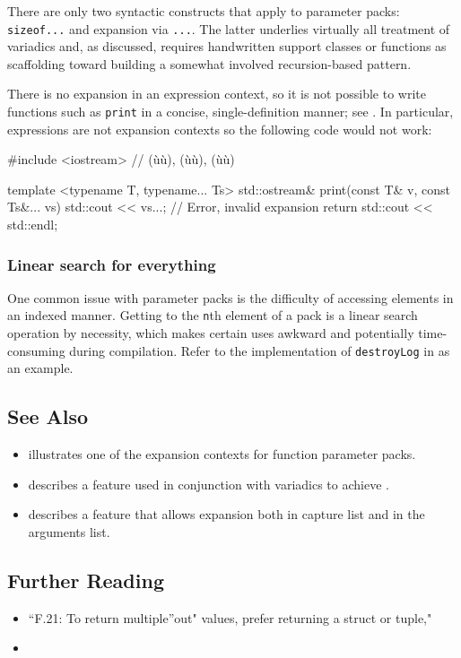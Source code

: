 There are only two syntactic constructs that apply to parameter packs:
\lstinline!sizeof...! and expansion via \lstinline!...!. The latter underlies
virtually all treatment of variadics and, as discussed, requires
handwritten support classes or functions as scaffolding toward building
a somewhat involved recursion-based pattern.

There is no expansion in an expression context, so it is not possible to
write functions such as \lstinline!print! in a concise, single-definition
manner; see . In particular, expressions are not expansion contexts so
the following code would not work:

\begin{emcppslisting}
#include <iostream>  // (ù{}ù), (ù{}ù), (ù{}ù)

template <typename T, typename... Ts>
std::ostream& print(const T& v, const Ts&... vs)
{
    std::cout << vs...;             // Error, invalid expansion
    return std::cout << std::endl;
}
\end{emcppslisting}
    

\subsubsection[Linear search for everything]{Linear search for everything}\label{linear-search-for-everything}

One common issue with parameter packs is the difficulty of accessing
elements in an indexed manner. Getting to the \lstinline!n!th element of a
pack is a linear search operation by necessity, which makes certain uses
awkward and potentially time-consuming during compilation. Refer to the
implementation of \lstinline!destroyLog! in  as an example.

\subsection[See Also]{See Also}\label{see-also}

\begin{itemize}
\item{ illustrates one of the expansion contexts for function parameter packs.}
\item{ describes a feature used in conjunction with variadics to achieve .}
\item{ describes a feature that allows expansion both in capture list and in the arguments list.}
\end{itemize}

\subsection[Further Reading]{Further Reading}\label{further-reading}

\begin{itemize}
\item{``F.21: To return multiple''out" values, prefer returning a struct or tuple," \cite{stroustrup20}}
\item{\cite{vandevoorde18}}
\end{itemize}


